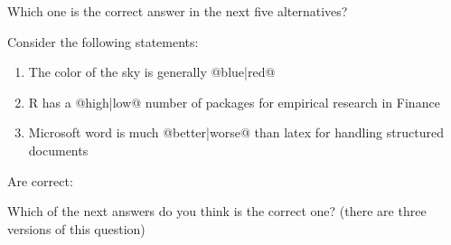 \documentclass[10pt]{examdesign}
\begin{document}
\vspace{1cm}

\begin{multiplechoice}[resetcounter=no,  examcolumns=1]

\begin{question}
	
	Which one is the correct answer in the next five alternatives?
	
	
	
	
	
	
\end{question}

\begin{question}
	
	Consider the following statements:
	
	\begin{enumerate}[I]
		\item The color of the sky is generally @{blue}|{red}@
		
		\item R has a @{high}|{low}@ number of packages for empirical research in Finance
		
		\item Microsoft word is much @{better}|{worse}@ than latex for handling structured documents
	\end{enumerate}
	
	Are correct:

	
	
	
	
	
\end{question}


\begin{question}
	
	Which of the next answers do you think is the correct one? (there are three versions of this question)
	
	
	
	

\end{question}
\end{multiplechoice}
\end{document}
